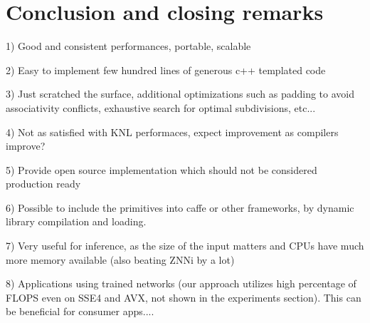 \section{Conclusion and closing remarks}

1) Good and consistent performances, portable, scalable

2) Easy to implement few hundred lines of generous c++ templated code

3) Just scratched the surface, additional optimizations such as
padding to avoid associativity conflicts, exhaustive search for optimal subdivisions, etc...

4) Not as satisfied with KNL performaces, expect improvement as compilers improve?

5) Provide open source implementation which should not be considered production ready

6) Possible to include the primitives into caffe or other frameworks,
by dynamic library compilation and loading.

7) Very useful for inference, as the size of the input matters and
CPUs have much more memory available (also beating ZNNi by a lot)

8) Applications using trained networks (our approach utilizes high
percentage of FLOPS even on SSE4 and AVX, not shown in the experiments
section).  This can be beneficial for consumer apps....

